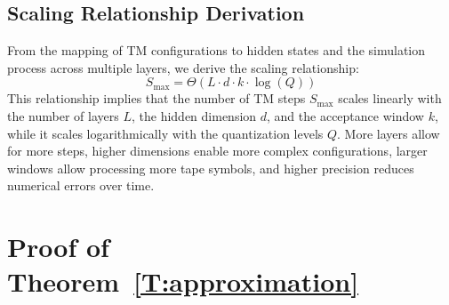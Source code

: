 

\subsection{Scaling Relationship Derivation}

From the mapping of TM configurations to hidden states and the simulation process across multiple layers, we derive the scaling relationship:
\[
S_{\text{max}} = \Theta(L \cdot d \cdot k \cdot \log(Q))
\]
This relationship implies that the number of TM steps \( S_{\text{max}} \) scales linearly with the number of layers \( L \), the hidden dimension \( d \), and the acceptance window \( k \), while it scales logarithmically with the quantization levels \( Q \). More layers allow for more steps, higher dimensions enable more complex configurations, larger windows allow processing more tape symbols, and higher precision reduces numerical errors over time.


\section{Proof of Theorem~\ref{T:approximation}}\label{appendix:theorem43}


